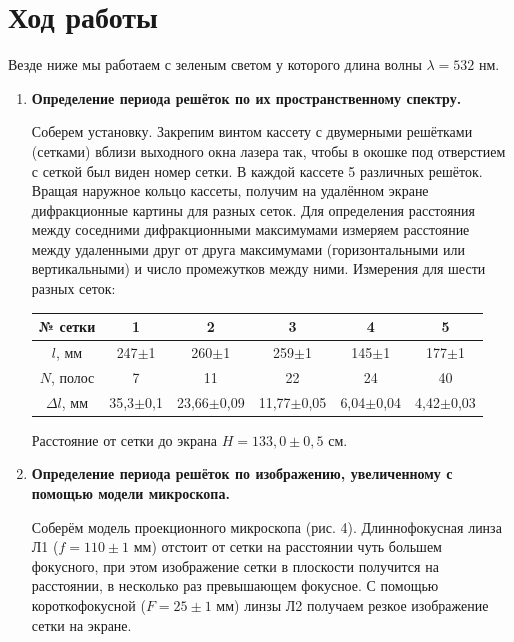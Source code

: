 \documentclass[a4paper,12pt]{article}
\begin{document}
	\section*{Ход работы}
	Везде ниже мы работаем с зеленым светом у которого длина волны $\lambda = 532  \text{ нм}$.
	\begin{enumerate}
		\item \textbf{Определение периода решёток по их пространственному спектру.}
		
		
		Соберем установку. Закрепим винтом кассету с двумерными решётками (сетками) вблизи выходного окна лазера так, чтобы в окошке под отверстием с сеткой был виден номер сетки. В каждой кассете 5 различных решёток.
		Вращая наружное кольцо кассеты, получим на удалённом экране дифракционные
		картины для разных сеток. Для определения расстояния между соседними дифракционными максимумами измеряем расстояние между удаленными друг от друга максимумами (горизонтальными или вертикальными) и число промежутков между ними.
		Измерения для шести разных сеток:
		\begin{center}
			\centering\begin{tabular}{|c|c|c|c|c|c|}
				\hline
				№ сетки & 1 & 2 & 3 & 4 & 5 \\ \hline
				$l$, мм & 247$\pm$1 & 260$\pm$1 & 259$\pm$1 & 145$\pm$1 & 177$\pm$1 \\ \hline
				$N$, полос & 7 & 11 & 22 & 24 & 40 \\ \hline
				$\Delta l$, мм & 35,3$\pm$0,1 & 23,66$\pm$0,09 & 11,77$\pm$0,05 & 6,04$\pm$0,04 & 4,42$\pm$0,03 \\ \hline
			\end{tabular}
		\end{center}
		
		Расстояние от сетки до экрана  $H = 133{,}0\pm0{,}5$ см.
		\item \textbf{Определение периода решёток по изображению, увеличенному с помощью модели микроскопа.}
		
		Соберём модель проекционного микроскопа (рис. 4). Длиннофокусная линза Л1 ($f = 110\pm1$ мм) отстоит от сетки на расстоянии чуть большем фокусного, при этом изображение сетки в плоскости получится на расстоянии, в несколько раз превышающем фокусное. С помощью короткофокусной ($F = 25\pm1$ мм) линзы Л2 получаем резкое изображение сетки на экране.
		

\end{enumerate}
\end{document}
